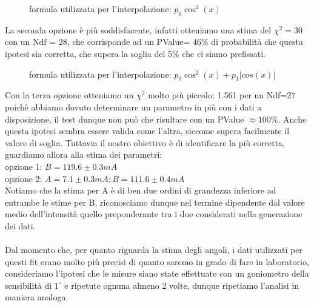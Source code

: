 \documentclass{article}
\theoremstyle{definition}
\begin{document}
\pagebreak

\begin{figure}[!ht]
    	\captionsetup{labelformat=empty}

	\caption{formula utilizzata per l'interpolazione: \(p_{0}\cos^{2}(x) \)}

\end{figure}

La seconda opzione è più soddisfacente, infatti otteniamo una stima del \(\chi^{2} = 30\) con un Ndf = 28, che corrisponde ad un PValue= 46\% di probabilità che questa ipotesi sia corretta, che supera la soglia del 5\% che ci siamo prefissati.\\

\begin{figure}[!ht]
    	\captionsetup{labelformat=empty}

	\caption{formula utilizzata per l'interpolazione: \(p_{0}\cos^{2}(x) + p_{1}\left| cos(x) \right|  \)}

\end{figure}

\noindent Con la terza opzione otteniamo un \(\chi^{2}\) molto più piccolo: 1.561 per un Ndf=27 poichè abbiamo dovuto determinare un parametro in più con i dati a disposizione, il test dunque non può che risultare con un PValue \(\approx 100\%\). Anche questa ipotesi sembra essere valida come l'altra, siccome supera facilmente il valore di soglia. Tuttavia il nostro obiettivo è di identificare la più corretta, guardiamo allora alla stima dei parametri:\\
opzione 1: \(B = 119.6 \pm 0.3 mA\)\\
opzione 2: \(A =  7.1 \pm 0.3 mA; B = 111.6 \pm 0.4mA\)\\
Notiamo che la stima per A è di ben due ordini di grandezza inferiore ad entrambe le stime per B, riconosciamo dunque nel termine dipendente dal valore medio dell'intensità quello preponderante tra i due considerati nella generazione dei dati.\\\\
Dal momento che, per quanto riguarda la stima degli angoli, i dati utilizzati per questi fit erano molto più precisi di quanto saremo in grado di fare in laboratorio, consideriamo l'ipotesi che le misure siano state effettuate con un goniometro della sensibilità di \(1^{\circ}\) e ripetute ognuna almeno 2 volte, dunque ripetiamo l'analisi in maniera analoga.\\
\end{document}
